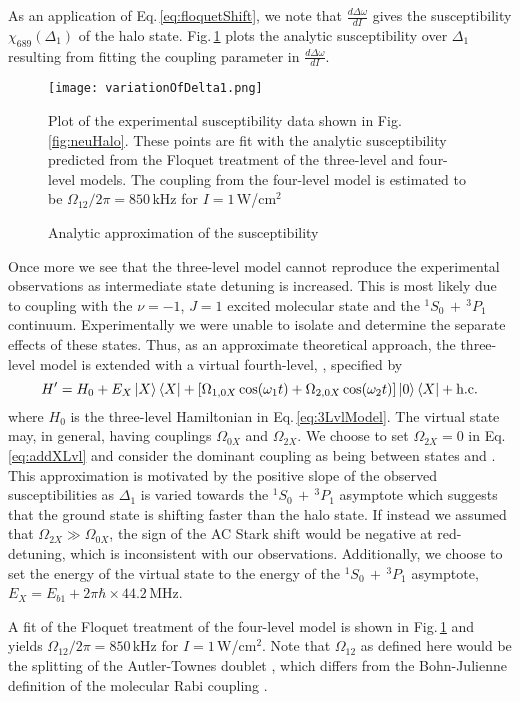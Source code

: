As an application of Eq.\,\ref{eq:floquetShift}, we note that $\frac{d \Delta\omega}{d I}$ gives the susceptibility $\chi_{689}(\Delta_1)$ of the halo state.
Fig.\,\ref{fig:floquetFitChi} plots the analytic susceptibility over $\Delta_1$ resulting from fitting the coupling parameter in $\frac{d \Delta\omega}{d I}$.
	\begin{figure} 
	\centerline{
	  \texttt{[image: variationOfDelta1.png]}}
	  \caption{Analytic approximation of the susceptibility}{Plot of the experimental susceptibility data shown in Fig.\,\ref{fig:neuHalo}. These points are fit with the analytic susceptibility predicted from the Floquet treatment of the three-level and four-level models. The coupling from the four-level model is estimated to be $\Omega_{12}/2\pi=850$\,kHz for $I=1$\,W/cm$^2$}
	  \label{fig:floquetFitChi}
	\end{figure}
Once more we see that the three-level model cannot reproduce the experimental observations as intermediate state detuning is increased.
This is most likely due to coupling with the $\nu=-1$, $J=1$ excited molecular state and the $^1S_0\,+\,^3P_1$ continuum.
Experimentally we were unable to isolate and determine the separate effects of these states.
Thus, as an approximate theoretical approach, the three-level model is extended with a virtual fourth-level, , specified by
\begin{equation} \label{eq:addXLvl}
	H'=H_0 + E_X\left| {X} \right>\left< {X} \right| + \left[ \Omega_{1,0X}\cos(\omega_1t) + \Omega_{2,0X}\cos(\omega_2t) \right] \left| {0} \right>\left< {X} \right| + \text{h.c.}
\end{equation}
where $H_0$ is the three-level Hamiltonian in Eq.\,\ref{eq:3LvlModel}.
The virtual state  may, in general, having couplings $\Omega_{0X}$ and $\Omega_{2X}$.
We choose to set $\Omega_{2X} = 0$ in Eq.\,\ref{eq:addXLvl} and consider the dominant coupling as being between states  and .
This approximation is motivated by the positive slope of the observed susceptibilities as $\Delta_1$ is varied towards the $^1S_0\,+\,^3P_1$ asymptote which suggests that the ground state is shifting faster than the halo state.
If instead we assumed that $\Omega_{2X} \gg \Omega_{0X}$, the sign of the AC Stark shift would be negative at red-detuning, which is inconsistent with our observations.
Additionally, we choose to set the energy of the virtual state to the energy of the $^1S_0\,+\,^3P_1$ asymptote, $E_X = E_{b1} + 2\pi\hbar \times 44.2$\,MHz.

A fit of the Floquet treatment of the four-level model is shown in Fig.\,\ref{fig:floquetFitChi} and yields $\Omega_{12}/2\pi=850$\,kHz for $I=1$\,W/cm$^2$.
Note that $\Omega_{12}$ as defined here would be the splitting of the Autler-Townes doublet \cite{MartinezDeEscobar2008, Pachomow2017a}, which differs from the Bohn-Julienne definition of the molecular Rabi coupling \cite{Bohn1996,Bohn1999}.

